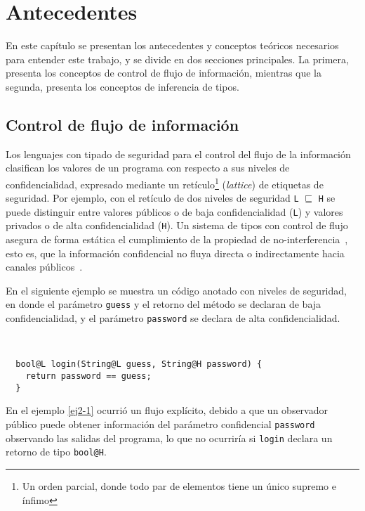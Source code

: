 \chapter{Antecedentes}
En este capítulo se presentan los antecedentes y conceptos teóricos necesarios para entender este trabajo, y se divide en dos secciones principales. La primera, presenta los conceptos de control de flujo de información, mientras que la segunda, presenta los conceptos de inferencia de tipos.

\section{Control de flujo de información} \label{controlflujo}
Los lenguajes con tipado de seguridad para el control del flujo de la información clasifican los valores de un programa con respecto a sus niveles de confidencialidad, expresado mediante un retículo\footnote{Un orden parcial, donde todo par de elementos tiene un único supremo e ínfimo} (\emph{lattice}) de etiquetas de seguridad. Por ejemplo, con el retículo de dos niveles de seguridad \texttt{L} $\sqsubseteq$ \texttt{H} se puede distinguir entre valores públicos o de baja confidencialidad (\texttt{L}) y valores privados o de alta confidencialidad (\texttt{H}). Un sistema de tipos con control de flujo asegura de forma estática el cumplimiento de la propiedad de no-interferencia~\cite{noninterference}, esto es, que la información confidencial no fluya directa o indirectamente hacia canales públicos~\cite{volpanoAl:S96}.

En el siguiente ejemplo se muestra un código anotado con niveles de seguridad, en donde el parámetro \texttt{guess} y el retorno del método se declaran de baja confidencialidad, y el parámetro \texttt{password} se declara de alta confidencialidad.

\begin{ej} \ \\
  \normalfont
  \label{ej2-1}
\begin{lstlisting}
  bool@L login(String@L guess, String@H password) {
    return password == guess;
  }
\end{lstlisting}
\end{ej}

En el ejemplo \ref{ej2-1} ocurrió un flujo explícito, debido a que un observador público puede obtener información del parámetro confidencial \texttt{password} observando las salidas del programa, lo que no ocurriría si \texttt{login} declara un retorno de tipo \texttt{bool@H}.

